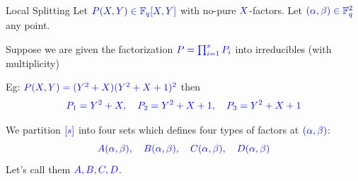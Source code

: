 \documentclass[10pt,handout]{beamer}
\begin{document}
\begin{frame}{Local Splitting}
	Let $\textcolor{blue}{\textcolor{blue}{P(X,Y)\in \mathbb{F}_q[X,Y]}}$ with no-pure $\textcolor{blue}{\textcolor{blue}{X}}$-factors. Let $\textcolor{blue}{\textcolor{blue}{(\alpha,\beta)\in\mathbb{F}_q^2}}$ any point.\pause

	Suppose we are given the factorization $\textcolor{blue}{\textcolor{blue}{P=\prod_{i=1}^s P_i}}$ into irreducibles (with multiplicity)\pause

	Eg: $\textcolor{blue}{\textcolor{blue}{P(X,Y)=(Y^2+X)(Y^2+X+1)^2}}$ then
	$$\textcolor{blue}{\textcolor{blue}{P_1=Y^2+X, \quad P_2=Y^2+X+1, \quad P_3=Y^2+X+1}}$$\pause

	We partition $\textcolor{blue}{\textcolor{blue}{[s]}}$ into four sets which defines four types of factors at $\textcolor{blue}{\textcolor{blue}{(\alpha,\beta)}}$:
	$$\textcolor{blue}{\textcolor{blue}{A(\alpha,\beta),\quad B(\alpha,\beta),\quad C(\alpha,\beta),\quad D(\alpha,\beta)}}$$
	Let's call them \textcolor{blue}{$\textcolor{blue}{A,B,C,D}$}.
\end{frame}
\end{document}
